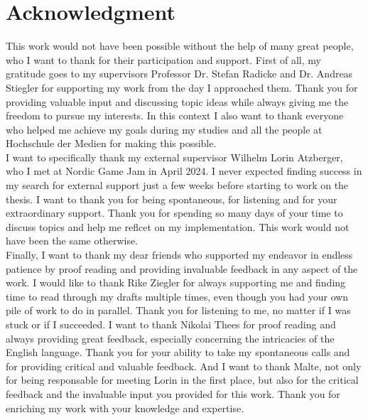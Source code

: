 \chapter{Acknowledgment}

This work would not have been possible without the help of many great people, who I want to thank for their 
participation and support. First of all, my gratitude goes to my supervisors Professor Dr. Stefan Radicke 
and Dr. Andreas Stiegler for supporting my work from the day I approached them. Thank you for providing 
valuable input and discussing topic ideas while always giving me the freedom to pursue my interests. In 
this context I also want to thank everyone who helped me achieve my goals during my studies and all the 
people at Hochschule der Medien for making this possible. \\

\noindent
I want to specifically thank my external supervisor Wilhelm Lorin Atzberger, who I met at Nordic Game Jam 
in April 2024. I never expected finding success in my search for external support just a few weeks before 
starting to work on the thesis. I want to thank you for being spontaneous, for listening and for your 
extraordinary support. Thank you for spending so many days of your time to discuss topics and help me 
reflcet on my implementation. This work would not have been the same otherwise. \\

\noindent
Finally, I want to thank my dear friends who supported my endeavor in endless patience by proof reading and 
providing invaluable feedback in any aspect of the work. I would like to thank Rike Ziegler for always 
supporting me and finding time to read through my drafts multiple times, even though you had your own 
pile of work to do in parallel. Thank you for listening to me, no matter if I was stuck or if I succeeded. 
I want to thank Nikolai Thees for proof reading and always providing great feedback, especially concerning 
the intricacies of the English language. Thank you for your ability to take my spontaneous calls and for 
providing critical and valuable feedback. And I want to thank Malte, not only for being responsable for 
meeting Lorin in the first place, but also for the critical feedback and the invaluable input you provided 
for this work. Thank you for enriching my work with your knowledge and expertise. \\
